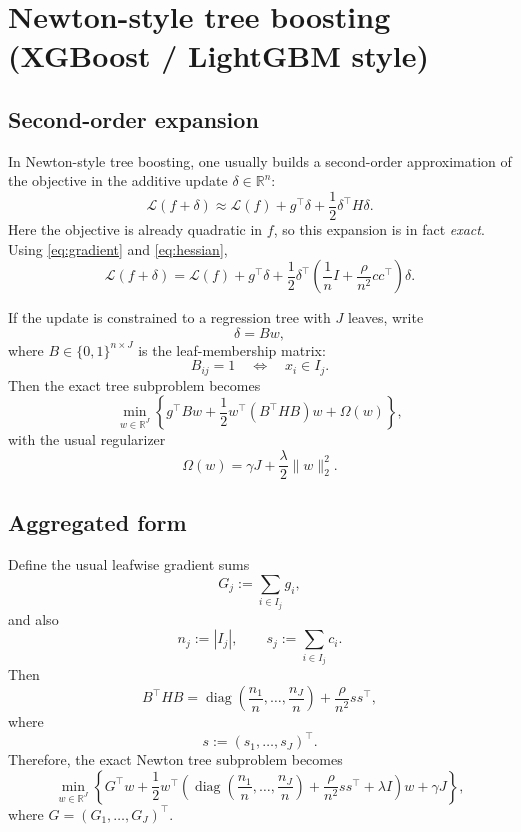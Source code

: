 \documentclass[11pt]{article}
\newcommand{\R}{\mathbb{R}}
\newcommand{\1}{\mathbf{1}}
\newcommand{\diag}{\operatorname{diag}}
\begin{document}
\section{Newton-style tree boosting (XGBoost / LightGBM style)}

\subsection{Second-order expansion}

In Newton-style tree boosting, one usually builds a second-order approximation of the objective in the additive update $\delta \in \R^n$:
\[
\mathcal{L}(f+\delta)
\approx
\mathcal{L}(f) + g^\top \delta + \frac{1}{2}\delta^\top H \delta.
\]
Here the objective is already quadratic in $f$, so this expansion is in fact \emph{exact}. Using \eqref{eq:gradient} and \eqref{eq:hessian},
\begin{equation}
\label{eq:exact-second-order}
\mathcal{L}(f+\delta)
=
\mathcal{L}(f) + g^\top \delta + \frac{1}{2}\delta^\top
\left(
\frac{1}{n}I + \frac{\rho}{n^2}cc^\top
\right)\delta.
\end{equation}

If the update is constrained to a regression tree with $J$ leaves, write
\[
\delta = Bw,
\]
where $B \in \{0,1\}^{n \times J}$ is the leaf-membership matrix:
\[
B_{ij} = 1
\quad \Longleftrightarrow \quad
x_i \in I_j.
\]
Then the exact tree subproblem becomes
\begin{equation}
\label{eq:newton-tree-subproblem}
\min_{w \in \R^J}
\left\{
g^\top Bw + \frac{1}{2}w^\top(B^\top H B)w + \Omega(w)
\right\},
\end{equation}
with the usual regularizer
\[
\Omega(w) = \gamma J + \frac{\lambda}{2}\|w\|_2^2.
\]

\subsection{Aggregated form}

Define the usual leafwise gradient sums
\begin{equation}
\label{eq:Gj}
G_j := \sum_{i \in I_j} g_i,
\end{equation}
and also
\begin{equation}
\label{eq:sj}
n_j := |I_j|,
\qquad
s_j := \sum_{i \in I_j} c_i.
\end{equation}
Then
\[
B^\top H B
=
\diag\left(\frac{n_1}{n},\dots,\frac{n_J}{n}\right)
+
\frac{\rho}{n^2}ss^\top,
\]
where
\[
s := (s_1,\dots,s_J)^\top.
\]
Therefore, the exact Newton tree subproblem becomes
\begin{equation}
\label{eq:newton-tree-subproblem-aggregated}
\min_{w \in \R^J}
\left\{
G^\top w
+
\frac{1}{2}
w^\top
\left(
\diag\left(\frac{n_1}{n},\dots,\frac{n_J}{n}\right)
+
\frac{\rho}{n^2}ss^\top
+
\lambda I
\right)
w
+
\gamma J
\right\},
\end{equation}
where $G = (G_1,\dots,G_J)^\top$.
\end{document}
